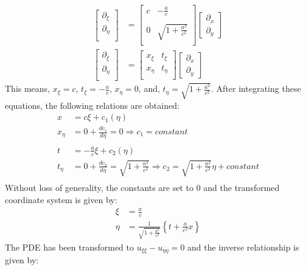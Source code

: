 \documentclass[11pt]{article}
\begin{document}
\begin{enumerate}
\begin{enumerate}[label = (\alph*)]
\begin{align*}
\begin{bmatrix}
\partial_\xi \\
\partial_\eta \\
\end{bmatrix} & = 
\begin{bmatrix}
c & -\frac{a}{c} \\ \\
0 & \sqrt{1 + \frac{a^2}{c^2}} \\
\end{bmatrix} 
\begin{bmatrix}
\partial_x \\
\partial_y
\end{bmatrix} \\
\begin{bmatrix}
\partial_\xi \\
\partial_\eta \\
\end{bmatrix} & = 
\begin{bmatrix}
x_\xi & t_\xi \\
x_\eta & t_\eta \\
\end{bmatrix}
\begin{bmatrix}
\partial_x \\
\partial_y
\end{bmatrix}
\end{align*}
This means, $x_\xi = c$, $t_\xi = -\frac{a}{c}$, $x_\eta = 0$, and, $t_\eta = \sqrt{1 + \frac{a^2}{c^2}}$. After integrating these equations, the following relations are obtained: 
\begin{align*}
x & = c\xi + c_1(\eta) \\
x_\eta & = 0 + \frac{dc_1}{d\eta} = 0 \Rightarrow c_1 = constant \\ \\
t & = -\frac{a}{c}\xi + c_2(\eta)\\
t_\eta & = 0 + \frac{dc_2}{d\eta} = \sqrt{1 + \frac{a^2}{c^2}} \Rightarrow c_2 = \sqrt{1 + \frac{a^2}{c^2}} \eta + constant \\
\end{align*}
Without loss of generality, the constants are set to $0$ and the transformed coordinate system is given by:
\begin{align*}
\xi & = \frac{x}{c} \\
\eta & = \frac{1}{\sqrt{1 + \frac{a^2}{c^2}}} \left\{ t + \frac{a}{c^2} x \right\} 
\end{align*}
The PDE has been transformed to $u_{\xi\xi} - u_{\eta\eta} = 0$ and the inverse relationship is given by: 

\end{enumerate}
\end{enumerate}
\end{document}
